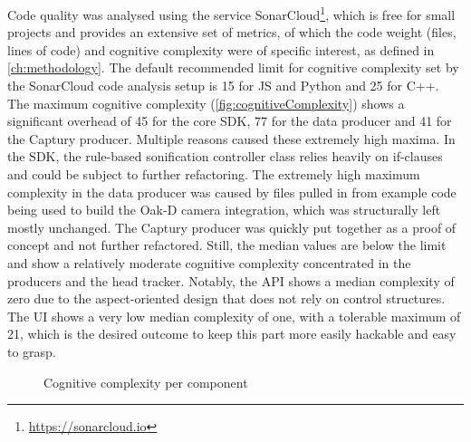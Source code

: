 Code quality was analysed using the service SonarCloud\footnote{\url{https://sonarcloud.io}}, which is free for small projects and provides an extensive set of metrics, of which the code weight (files, lines of code) and cognitive complexity were of specific interest, as defined in \autoref{ch:methodology}.
The default recommended limit for cognitive complexity set by the SonarCloud code analysis setup is 15 for \ac{JS} and Python and 25 for C++.
The maximum cognitive complexity (\autoref{fig:cognitiveComplexity}) shows a significant overhead of 45 for the core \ac{SDK}, 77 for the data producer and 41 for the Captury producer.
Multiple reasons caused these extremely high maxima.
In the \ac{SDK}, the rule-based sonification controller class relies heavily on if-clauses and could be subject to further refactoring.
The extremely high maximum complexity in the data producer was caused by files pulled in from example code being used to build the Oak-D camera integration, which was structurally left mostly unchanged.
The Captury producer was quickly put together as a proof of concept and not further refactored.
Still, the median values are below the limit and show a relatively moderate cognitive complexity concentrated in the producers and the head tracker.
Notably, the \ac{API} shows a median complexity of zero due to the aspect-oriented design that does not rely on control structures.
The \ac{UI} shows a very low median complexity of one, with a tolerable maximum of 21, which is the desired outcome to keep this part more easily hackable and easy to grasp.

\begin{figure}[!ht]
\centering

\caption[Cognitive complexity]{Cognitive complexity per component\protect}
\label{fig:cognitiveComplexity}
\end{figure}

